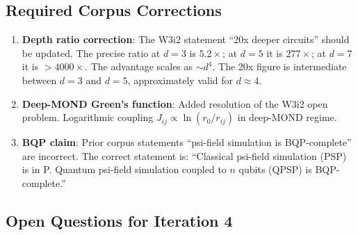 \documentclass[11pt]{article}
\theoremstyle{definition}
\theoremstyle{remark}
\begin{document}
\subsection{Required Corpus Corrections}

\begin{enumerate}
\item \textbf{Depth ratio correction}: The W3i2 statement ``20x deeper
  circuits'' should be updated. The precise ratio at $d=3$ is $5.2\times$;
  at $d=5$ it is $277\times$; at $d=7$ it is $>4000\times$. The advantage
  scales as $\sim d^4$. The 20x figure is intermediate between $d=3$ and
  $d=5$, approximately valid for $d\approx4$.

\item \textbf{Deep-MOND Green's function}: Added resolution of the W3i2
  open problem. Logarithmic coupling $J_{ij} \propto \ln(r_0/r_{ij})$
  in deep-MOND regime.

\item \textbf{BQP claim}: Prior corpus statements ``psi-field simulation
  is BQP-complete'' are incorrect. The correct statement is: ``Classical
  psi-field simulation (PSP) is in P. Quantum psi-field simulation
  coupled to $n$ qubits (QPSP) is BQP-complete.''
\end{enumerate}

\subsection{Open Questions for Iteration 4}
\end{document}
